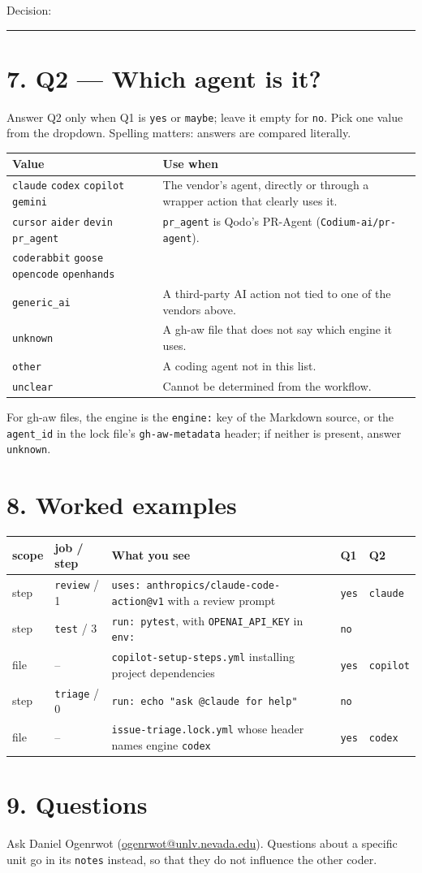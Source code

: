 \documentclass[10pt,a4paper]{article}
\newcommand{\val}[1]{\texttt{#1}}
\begin{document}
\medskip
Decision: \rule{0.6\linewidth}{0.4pt}

\section*{7. Q2 --- Which agent is it?}

Answer Q2 only when Q1 is \val{yes} or \val{maybe}; leave it empty for \val{no}.
Pick one value from the dropdown. Spelling matters: answers are compared
literally.

\begin{tabularx}{\linewidth}{@{}l L@{}}
\toprule
\textbf{Value} & \textbf{Use when} \\
\midrule
\val{claude} \val{codex} \val{copilot} \val{gemini} & The vendor's agent, directly or through a wrapper action that clearly uses it. \\
\val{cursor} \val{aider} \val{devin} \val{pr\_agent} & \val{pr\_agent} is Qodo's PR-Agent (\val{Codium-ai/pr-agent}). \\
\val{coderabbit} \val{goose} \val{opencode} \val{openhands} & \\
\val{generic\_ai} & A third-party AI action not tied to one of the vendors above. \\
\val{unknown} & A gh-aw file that does not say which engine it uses. \\
\val{other} & A coding agent not in this list. \\
\val{unclear} & Cannot be determined from the workflow. \\
\bottomrule
\end{tabularx}

For gh-aw files, the engine is the \val{engine:} key of the Markdown source, or
the \val{agent\_id} in the lock file's \val{gh-aw-metadata} header; if neither
is present, answer \val{unknown}.

\section*{8. Worked examples}

\begin{tabularx}{\linewidth}{@{}l l L l l@{}}
\toprule
\textbf{scope} & \textbf{job / step} & \textbf{What you see} & \textbf{Q1} & \textbf{Q2} \\
\midrule
step & \val{review} / 1 & \val{uses: anthropics/claude-code-action@v1} with a review prompt & \val{yes} & \val{claude} \\
step & \val{test} / 3 & \val{run: pytest}, with \val{OPENAI\_API\_KEY} in \val{env:} & \val{no} & \\
file & -- & \val{copilot-setup-steps.yml} installing project dependencies & \val{yes} & \val{copilot} \\
step & \val{triage} / 0 & \val{run: echo "ask @claude for help"} & \val{no} & \\
file & -- & \val{issue-triage.lock.yml} whose header names engine \val{codex} & \val{yes} & \val{codex} \\
\bottomrule
\end{tabularx}

\section*{9. Questions}

Ask Daniel Ogenrwot (\href{mailto:ogenrwot@unlv.nevada.edu}{ogenrwot@unlv.nevada.edu}).
Questions about a specific unit go in its \val{notes} instead, so that they do not
influence the other coder.
\end{document}
